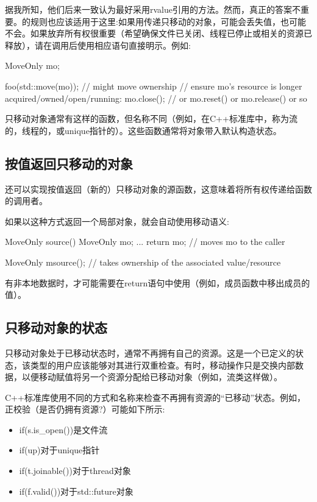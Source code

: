 据我所知，他们后来一致认为最好采用rvalue引用的方法。然而，真正的答案不重要。的规则也应该适用于这里:如果用传递只移动的对象，可能会丢失值，也可能不会。如果放弃所有权很重要（希望确保文件已关闭、线程已停止或相关的资源已释放），请在调用后使用相应语句直接明示。例如:

\begin{cppcode}
MoveOnly mo;

foo(std::move(mo)); // might move ownership
// ensure mo’s resource is longer acquired/owned/open/running:
mo.close(); // or mo.reset() or mo.release() or so
\end{cppcode}

只移动对象通常有这样的函数，但名称不同（例如，在C++标准库中，称为流的，线程的，或unique指针的）。这些函数通常将对象带入默认构造状态。

\subsection{按值返回只移动的对象}

还可以实现按值返回（新的）只移动对象的源函数，这意味着将所有权传递给函数的调用者。

如果以这种方式返回一个局部对象，就会自动使用移动语义:

\begin{cppcode}
MoveOnly source()
{
	MoveOnly mo;
	...
	return mo; // moves mo to the caller
}

MoveOnly m{source()}; // takes ownership of the associated value/resource
\end{cppcode}

有非本地数据时，才可能需要在return语句中使用（例如，成员函数中移出成员的值）。

\subsection{只移动对象的状态}

只移动对象处于已移动状态时，通常不再拥有自己的资源。这是一个已定义的状态，该类型的用户应该能够对其进行双重检查。有时，移动操作只是交换内部数据，以便移动赋值将另一个资源分配给已移动对象（例如，流类这样做）。

C++标准库使用不同的方式和名称来检查不再拥有资源的“已移动”状态。例如，正校验（是否仍拥有资源?）可能如下所示:

\begin{itemize}
	\item if(s.is_open())是文件流
	\item if(up)对于unique指针
	\item if(t.joinable())对于thread对象
	\item if(f.valid())对于std::future对象
\end{itemize}














